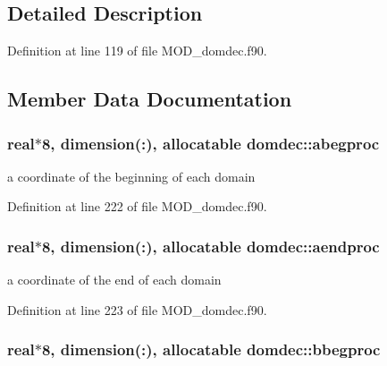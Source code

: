 \subsection{Detailed Description}


Definition at line 119 of file M\-O\-D\-\_\-domdec.\-f90.



\subsection{Member Data Documentation}
\hypertarget{classdomdec_a46373c0f7de529f851998ff815e9668b}{
\subsubsection[{abegproc}]{\setlength{\rightskip}{0pt plus 5cm}real$\ast$8, dimension(\-:), allocatable domdec\-::abegproc}}\label{classdomdec_a46373c0f7de529f851998ff815e9668b}


a coordinate of the beginning of each domain 



Definition at line 222 of file M\-O\-D\-\_\-domdec.\-f90.

\hypertarget{classdomdec_a2ea87a3cfae5a30a0bc8c6bfc5df1d3d}{
\subsubsection[{aendproc}]{\setlength{\rightskip}{0pt plus 5cm}real$\ast$8, dimension(\-:), allocatable domdec\-::aendproc}}\label{classdomdec_a2ea87a3cfae5a30a0bc8c6bfc5df1d3d}


a coordinate of the end of each domain 



Definition at line 223 of file M\-O\-D\-\_\-domdec.\-f90.

\hypertarget{classdomdec_aef7dcbfb9b97d34a3a5120ef84a43202}{
\subsubsection[{bbegproc}]{\setlength{\rightskip}{0pt plus 5cm}real$\ast$8, dimension(\-:), allocatable domdec\-::bbegproc}}\label{classdomdec_aef7dcbfb9b97d34a3a5120ef84a43202}


